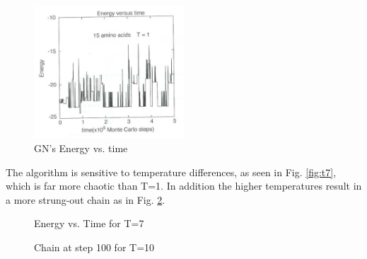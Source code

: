 \documentclass{article}
\begin{document}
	\begin{figure}[h]
		\centering
		\includegraphics[width=0.5\textwidth]{compare}
	    \caption{GN's Energy vs. time \cite{GN}}
		\label{fig:gncompare}
	\end{figure}
	
	The algorithm is sensitive to temperature differences, as seen in Fig. \ref{fig:t7}, which is far more chaotic than T=1. In addition the higher temperatures result in a more strung-out chain as in Fig. \ref{fig:t10}.

	\begin{figure}[h]
	  \begin{floatrow}
	    {\caption{Energy vs. Time for T=7}
	  \label{fig:t7}}
	  {\caption{Chain at step 100 for T=10}
	  \label{fig:t10}}
	  \end{floatrow}
	\end{figure}
	
\end{document}
